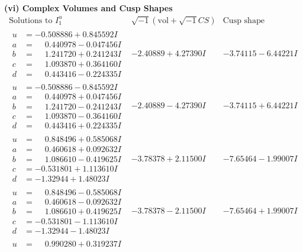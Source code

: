 \documentclass[1p]{elsarticle_modified}
\theoremstyle{definition}
\newcommand{\I}{\sqrt{-1}}
\begin{document}
\newpage\flushleft \textbf{(vi) Complex Volumes and Cusp Shapes}
$$\begin{array}{c|c|c}  
\text{Solutions to }I^u_{1}& \I (\text{vol} + \sqrt{-1}CS) & \text{Cusp shape}\\
 \hline 
\begin{aligned}
u &= -0.508886 + 0.845592 I \\
a &= \phantom{-}0.440978 - 0.047456 I \\
b &= \phantom{-}1.241720 + 0.241243 I \\
c &= \phantom{-}1.093870 + 0.364160 I \\
d &= \phantom{-}0.443416 - 0.224335 I\end{aligned}
 & -2.40889 + 4.27390 I & -3.74115 - 6.44221 I \\ \hline\begin{aligned}
u &= -0.508886 - 0.845592 I \\
a &= \phantom{-}0.440978 + 0.047456 I \\
b &= \phantom{-}1.241720 - 0.241243 I \\
c &= \phantom{-}1.093870 - 0.364160 I \\
d &= \phantom{-}0.443416 + 0.224335 I\end{aligned}
 & -2.40889 - 4.27390 I & -3.74115 + 6.44221 I \\ \hline\begin{aligned}
u &= \phantom{-}0.848496 + 0.585068 I \\
a &= \phantom{-}0.460618 + 0.092632 I \\
b &= \phantom{-}1.086610 - 0.419625 I \\
c &= -0.531801 + 1.113610 I \\
d &= -1.32944 + 1.48023 I\end{aligned}
 & -3.78378 + 2.11500 I & -7.65464 - 1.99007 I \\ \hline\begin{aligned}
u &= \phantom{-}0.848496 - 0.585068 I \\
a &= \phantom{-}0.460618 - 0.092632 I \\
b &= \phantom{-}1.086610 + 0.419625 I \\
c &= -0.531801 - 1.113610 I \\
d &= -1.32944 - 1.48023 I\end{aligned}
 & -3.78378 - 2.11500 I & -7.65464 + 1.99007 I \\ \hline\begin{aligned}
u &= \phantom{-}0.990280 + 0.319237 I \\

\end{aligned}
\end{array}$$
\end{document}
